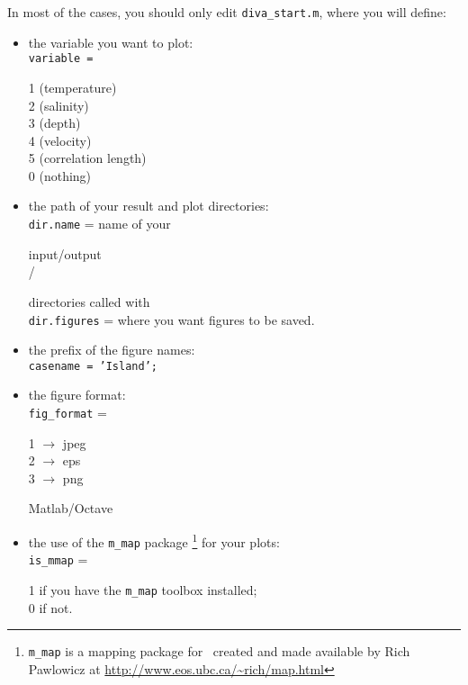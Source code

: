In most of the cases, you should only edit \texttt{diva\_start.m}, where you will define:

\begin{itemize}

\item the variable you want to plot:\\
\texttt{variable =} \begin{minipage}[t]{6.6cm}
            1 (temperature)\\
            2 (salinity)\\
            3 (depth)\\
            4 (velocity)\\
            5 (correlation length)\\
            0 (nothing)
           \end{minipage}
           
\item the path of your result and plot directories:\\

\texttt{dir.name} = name of your  \begin{minipage}[t]{3cm}    input/output \\  / \end{minipage}  directories called with\\
\texttt{dir.figures} = where you want figures to be saved.

\item the prefix of the figure names:\\  
    
\texttt{casename = 'Island';}

\item the figure format:\\

\texttt{fig\_format} = \begin{minipage}[t]{5cm}
           1 $\rightarrow$ jpeg\\
           2 $\rightarrow$ eps\\
           3 $\rightarrow$ png
           \end{minipage}
Matlab/Octave
\item the use of the \texttt{m\_map} package \footnote{\texttt{m\_map} is a mapping package for \matlab\, created and made available by Rich Pawlowicz at \url{http://www.eos.ubc.ca/~rich/map.html}} for your plots:\\

\texttt{is\_mmap} = \begin{minipage}[t]{5cm}
           1  if you have the \texttt{m\_map} toolbox installed;\\
           0  if not.
           \end{minipage}
\end{itemize}
 

